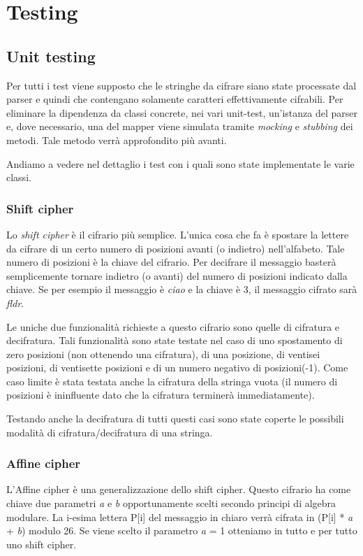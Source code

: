 \chapter{Testing}

	\section{Unit testing}
		Per tutti i test viene supposto che le stringhe da cifrare siano state processate dal parser e quindi che contengano solamente caratteri effettivamente cifrabili. Per eliminare la dipendenza da classi concrete, nei vari unit-test, un'istanza del parser e, dove necessario, una del mapper viene simulata tramite \emph{mocking} e \emph{stubbing} dei metodi. Tale metodo verrà approfondito più avanti.
		
		Andiamo a vedere nel dettaglio i test con i quali sono state implementate le varie classi.
		
		\subsection{Shift cipher}
			Lo \emph{shift cipher} è il cifrario più semplice. L'unica cosa che fa è spostare la lettere da cifrare di un certo numero di posizioni avanti (o indietro) nell'alfabeto. Tale numero di posizioni è la chiave del cifrario. Per decifrare il messaggio basterà semplicemente tornare indietro (o avanti) del numero di posizioni indicato dalla chiave. Se per esempio il messaggio è \emph{ciao} e la chiave è 3, il messaggio cifrato sarà \emph{fldr}.
			
			Le uniche due funzionalità richieste a questo cifrario sono quelle di cifratura e decifratura. Tali funzionalità sono state testate nel caso di uno spostamento di zero posizioni (non ottenendo una cifratura), di una posizione, di ventisei posizioni, di ventisette posizioni e di un numero negativo di posizioni(-1). Come caso limite è stata testata anche la cifratura della stringa vuota (il numero di posizioni è ininfluente dato che la cifratura terminerà immediatamente).
			
			Testando anche la decifratura di tutti questi casi sono state coperte le possibili modalità di cifratura/decifratura di una stringa.
			
		\subsection{Affine cipher}
			L'Affine cipher è una generalizzazione dello shift cipher. Questo cifrario ha come chiave due parametri \emph{a} e \emph{b} opportunamente scelti secondo principi di algebra modulare. La i-esima lettera P[i] del messaggio in chiaro verrà cifrata in (P[i] * \emph{a} + \emph{b}) modulo 26. Se viene scelto il parametro \emph{a} = 1 otteniamo in tutto e per tutto uno shift cipher.
			
